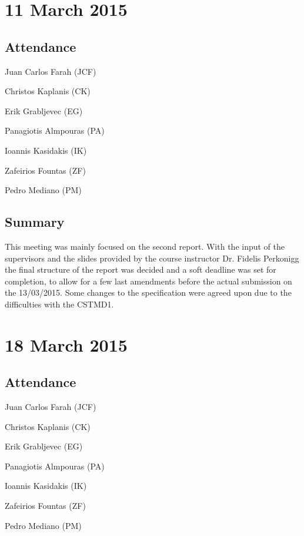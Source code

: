 \documentclass[a4paper,11pt]{article}
\begin{document}
\begin{appendices}
\maketitle
\section*{11 March 2015}
\subsection*{Attendance}
\begin{compactenum}
\item Juan Carlos Farah (JCF)
\item Christos Kaplanis (CK)
\item Erik Grabljevec (EG)
\item Panagiotis Almpouras (PA)
\item Ioannis Kasidakis (IK)
\item Zafeirios Fountas (ZF)
\item Pedro Mediano (PM)
\end{compactenum}

\subsection*{Summary}
This meeting was mainly focused on the second report. With the input of the supervisors and the slides provided by the course instructor Dr. Fidelis Perkonigg the final structure of the report was decided and a soft deadline was set for completion, to allow for a few last amendments before the actual submission on the 13/03/2015. Some changes to the specification were agreed upon due to the difficulties with the CSTMD1.

\maketitle
\section*{18 March 2015}
\subsection*{Attendance}
\begin{compactenum}
\item Juan Carlos Farah (JCF)
\item Christos Kaplanis (CK)
\item Erik Grabljevec (EG)
\item Panagiotis Almpouras (PA)
\item Ioannis Kasidakis (IK)
\item Zafeirios Fountas (ZF)
\item Pedro Mediano (PM)
\end{compactenum}


\end{appendices}
\end{document}
